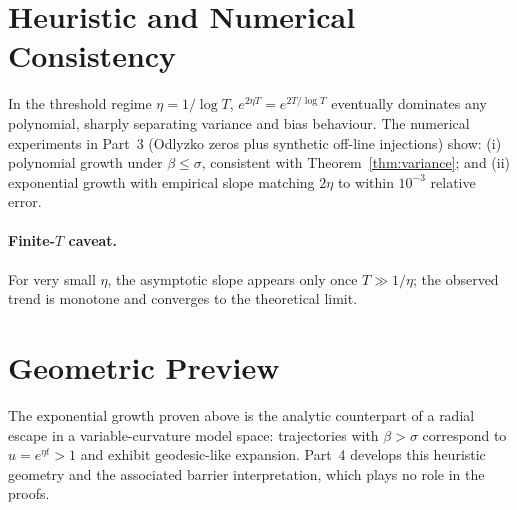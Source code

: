 \section{Heuristic and Numerical Consistency}\label{sec:numerics}

In the threshold regime $\eta=1/\log T$, $e^{2\eta T}=e^{2T/\log T}$
eventually dominates any polynomial, sharply separating variance and bias behaviour.
The numerical experiments in Part~3 (Odlyzko zeros plus synthetic off-line injections)
show:
(i) polynomial growth under $\beta\le\sigma$, consistent with
Theorem~\ref{thm:variance}; and
(ii) exponential growth with empirical slope matching $2\eta$ to within $10^{-3}$ relative error.

\paragraph{Finite-$T$ caveat.}
For very small $\eta$, the asymptotic slope appears only once $T\gg1/\eta$;
the observed trend is monotone and converges to the theoretical limit.

\section{Geometric Preview}\label{sec:geom-preview}

The exponential growth proven above is the analytic counterpart of a
radial escape in a variable-curvature model space:
trajectories with $\beta>\sigma$ correspond to $u=e^{\eta t}>1$
and exhibit geodesic-like expansion.
Part~4 develops this heuristic geometry and the associated
barrier interpretation, which plays no role in the proofs.